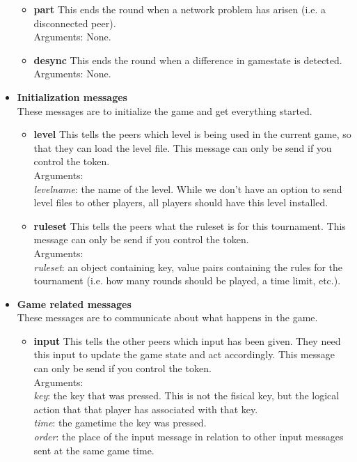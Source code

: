 \documentclass[a4paper,twoside,11pt]{article}
\begin{document}
\begin{itemize}
\begin{itemize}
      \item \textbf{part}
This ends the round when a network problem has arisen (i.e. a disconnected peer).\\
Arguments: None. \\

      \item \textbf{desync}
This ends the round when a difference in gamestate is detected.\\
Arguments: None. \\

    \end{itemize}

  \item \textbf{Initialization messages} \\
  These messages are to initialize the game and get everything started.
    \begin{itemize}
      \item \textbf{level}
This tells the peers which level is being used in the current game, so that they can load the level file. This message can only be send if you control the token. \\
Arguments: \\
\textit{levelname}: the name of the level. While we don't have an option to send level files to other players, all players should have this level installed.\\

      \item \textbf{ruleset}
This tells the peers what the ruleset is for this tournament. This message can only be send if you control the token.\\
Arguments: \\
\textit{ruleset}: an object containing key, value pairs containing the rules for the tournament (i.e. how many rounds should be played, a time limit, etc.). \\
    \end{itemize}

  \item \textbf{Game related messages} \\
  These messages are to communicate about what happens in the game.
    \begin{itemize}
      \item \textbf{input}
This tells the other peers which input has been given. They need this input to update the game state and act accordingly. This message can only be send if you control the token.\\
Arguments: \\
\textit{key}: the key that was pressed. This is not the fisical key, but the logical action that that player has associated with that key. \\
\textit{time}: the gametime the key was pressed. \\
\textit{order}: the place of the input message in relation to other input messages sent at the same game time. \\


\end{itemize}
\end{itemize}
\end{document}
